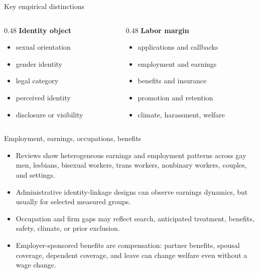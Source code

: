 \documentclass[aspectratio=169,11pt]{beamer}
\begin{document}
\begin{frame}{Key empirical distinctions}
\begin{columns}[T,onlytextwidth]
\begin{column}{0.48\linewidth}
\textbf{Identity object}
\begin{itemize}
    \item sexual orientation
    \item gender identity
    \item legal category
    \item perceived identity
    \item disclosure or visibility
\end{itemize}
\end{column}
\begin{column}{0.48\linewidth}
\textbf{Labor margin}
\begin{itemize}
    \item applications and callbacks
    \item employment and earnings
    \item benefits and insurance
    \item promotion and retention
    \item climate, harassment, welfare
\end{itemize}
\end{column}
\end{columns}
\end{frame}

\begin{frame}{Employment, earnings, occupations, benefits}
\begin{itemize}
    \item Reviews show heterogeneous earnings and employment patterns across gay men, lesbians, bisexual workers, trans workers, nonbinary workers, couples, and settings.
    \item Administrative identity-linkage designs can observe earnings dynamics, but usually for selected measured groups.
    \item Occupation and firm gaps may reflect search, anticipated treatment, benefits, safety, climate, or prior exclusion.
    \item Employer-sponsored benefits are compensation: partner benefits, spousal coverage, dependent coverage, and leave can change welfare even without a wage change.
\end{itemize}
\end{frame}
\end{document}
